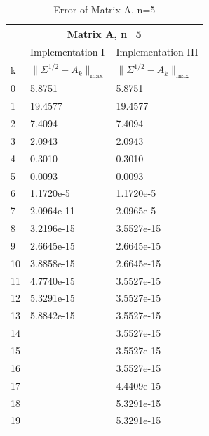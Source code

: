 \begin{table}
\begin{center}
\label{Table: A5}
\begin{tabular}{| l | l | l | }

	\hline
	\multicolumn{3}{|c|}{Matrix A, n=5}  \\
	\hline
	   & Implementation I & Implementation III \\
	k & $\parallel \Sigma^{1/2} - A_{k}\parallel_{\text{max}}$ & $\parallel \Sigma^{1/2} - A_{k}\parallel_{\text{max}}$  \\	
	\hline
	0 &  5.8751& 5.8751 \\
	1 & 19.4577& 19.4577  \\
	2 & 7.4094& 7.4094   \\
	3 & 2.0943& 2.0943 \\
	4 & 0.3010& 0.3010  \\
	5 & 0.0093& 0.0093  \\
	6 & 1.1720e-5& 1.1720e-5  \\
	7 & 2.0964e-11& 2.0965e-5  \\
	8 & 3.2196e-15& 3.5527e-15 \\
	9 & 2.6645e-15& 2.6645e-15  \\
	10& 3.8858e-15 & 2.6645e-15\\ 
	11& 4.7740e-15 & 3.5527e-15\\
	12&5.3291e-15 & 3.5527e-15 \\
	13&5.8842e-15 &3.5527e-15 \\
	14& &3.5527e-15\\
	15& & 3.5527e-15 \\
	16& & 3.5527e-15 \\
	17& &4.4409e-15\\
	18& & 5.3291e-15\\
	19& &5.3291e-15 \\
	\hline
	
\end{tabular}
\caption{Error of Matrix A, n=5}
\end{center}
\end{table}

